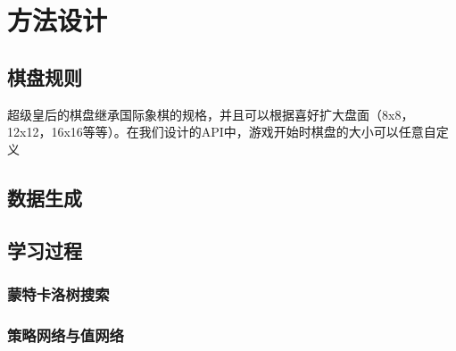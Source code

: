\chapter{方法设计}
\label{chap:algorithm}

\section{棋盘规则}
超级皇后的棋盘继承国际象棋的规格，并且可以根据喜好扩大盘面（8x8，12x12，16x16等等）。在我们设计的API中，游戏开始时棋盘的大小可以任意自定义
\section{数据生成}

\section{学习过程}

\subsection{蒙特卡洛树搜索}

\subsection{策略网络与值网络}